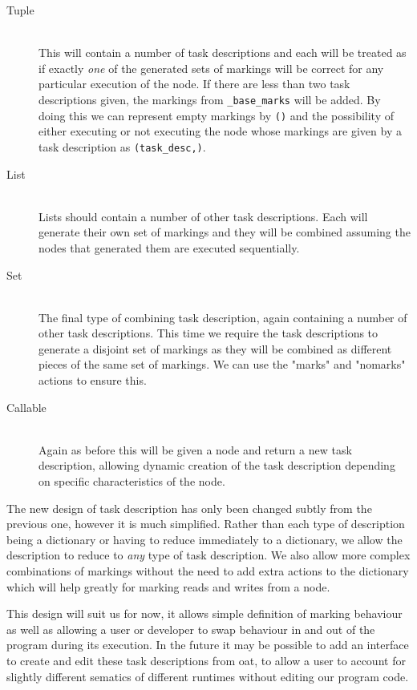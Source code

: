 \documentclass{report}
\begin{document}
\begin{description}
\item[Tuple] \hfill \\
This will contain a number of task descriptions and each will be treated as if exactly \textit{one} of the generated sets of markings will be correct
for any particular execution of the node. If there are less than two task descriptions given, the markings from \texttt{\_base\_marks} will be added.
By doing this we can represent empty markings by \texttt{()} and the possibility of either executing or not executing the node whose markings are
given by a task description as \texttt{(task\_desc,)}.

\item[List] \hfill \\
Lists should contain a number of other task descriptions. Each will generate their own set of markings and they will be combined assuming the nodes
that generated them are executed sequentially.

\item[Set] \hfill \\
The final type of combining task description, again containing a number of other task descriptions. This time we require the task descriptions to
generate a disjoint set of markings as they will be combined as different pieces of the same set of markings. We can use the "marks" and "nomarks"
actions to ensure this.

\item[Callable] \hfill \\
Again as before this will be given a node and return a new task description, allowing dynamic creation of the task description depending on
specific characteristics of the node.

\end{description}

The new design of task description has only been changed subtly from the previous one, however it is much simplified. Rather than each type of
description being a dictionary or having to reduce immediately to a dictionary, we allow the description to reduce to \textit{any} type of 
task description. We also allow more complex combinations of markings without the need to add extra actions to the dictionary which will
help greatly for marking reads and writes from a node.

This design will suit us for now, it allows simple definition of marking behaviour as well as allowing a user or developer to swap behaviour in
and out of the program during its execution. In the future it may be possible to add an interface to create and edit these task descriptions from
oat, to allow a user to account for slightly different sematics of different runtimes without editing our program code.
\end{document}
